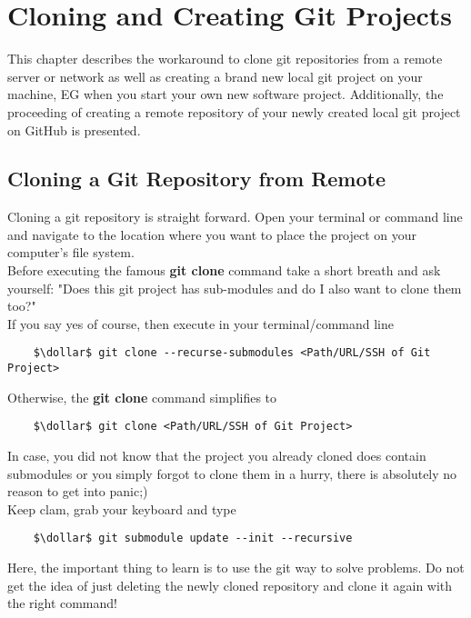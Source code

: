 \chapter{Cloning and Creating Git Projects}
\label{chapter:1}

This chapter describes the workaround to clone git repositories from a remote server or network as well as creating 
a brand new local git project on your machine, \ac{EG} when you start your own new software project. 
Additionally, the proceeding of creating a remote repository of 
your newly created local git project on GitHub is presented.


\section{Cloning a Git Repository from Remote}
\label{chapter:1.1}

Cloning a git repository is straight forward. Open your terminal or command line and navigate to the location where 
you want to place the project on your computer's file system. 
\\
Before executing the famous \textbf{git clone} command take a short breath and ask yourself: "Does this git project has 
sub-modules and do I also want to clone them too?"
\\ 
If you say yes of course, then execute in your terminal/command line

\lstset{style=Terminal}
\begin{lstlisting}
	$\dollar$ git clone --recurse-submodules <Path/URL/SSH of Git Project>
\end{lstlisting}

Otherwise, the \textbf{git clone} command simplifies to

\begin{lstlisting}
	$\dollar$ git clone <Path/URL/SSH of Git Project>
\end{lstlisting}

In case, you did not know that the project you already cloned does contain submodules or you simply forgot to clone them in a hurry,
there is absolutely no reason to get into panic;)
\\
Keep clam, grab your keyboard and type 
\begin{lstlisting}
	$\dollar$ git submodule update --init --recursive
\end{lstlisting}

Here, the important thing to learn is to use the git way to solve problems. Do not get the idea of just deleting the newly cloned repository 
and clone it again with the right command! 


